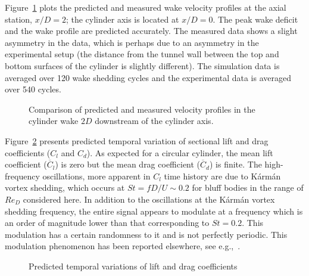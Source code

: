 Figure~\ref{fig:velocity_Normal_Re20k} plots the predicted and measured wake
velocity profiles at the axial station, $x/D=2$; the cylinder axis is located
at $x/D=0$. The peak wake deficit and the wake profile are predicted
accurately. The measured data shows a slight asymmetry in the data, which is
perhaps due to an asymmetry in the experimental setup (the distance from the
tunnel wall between the top and bottom surfaces of the cylinder is slightly
different). The simulation data is averaged over 120 wake shedding cycles and
the experimental data is averaged over 540 cycles.
%
\begin{figure}[htb!]
  \caption{Comparison of predicted and measured velocity profiles in the
    cylinder wake $2D$ downstream of the cylinder axis.}
  \label{fig:velocity_Normal_Re20k}
\end{figure}

Figure~\ref{fig:force_20k} presents predicted temporal variation of sectional
lift and drag coefficients ($C_l$ and $C_d$). As expected for a circular
cylinder, the mean lift coefficient ($\overline{C}_l$) is zero but the mean
drag coefficient ($\overline{C}_d$) is finite. The high-frequency oscillations,
more apparent in $C_l$ time history are due to K\'arm\'an vortex shedding, which
occurs at $St=fD/U \sim 0.2$ for bluff bodies in the range of $Re_D$ considered
here. In addition to the oscillations at the K\'arm\'an vortex shedding frequency,
the entire signal appears to modulate at a frequency which is an order of
magnitude lower than that corresponding to $St=0.2$. This modulation has a
certain randomness to it and is not perfectly periodic. This modulation
phenomenon has been reported elsewhere, see e.g.,~\cite{travin2000detached}. 
%
\begin{figure}[htb!]
  \caption{Predicted temporal variations of lift and drag coefficients}
  \label{fig:force_20k}
\end{figure}

